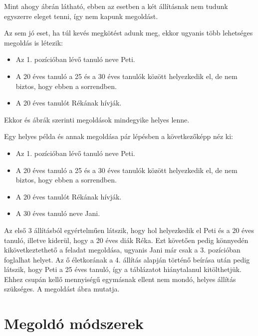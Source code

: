 \documentclass[12pt,a4paper,oneside]{report}
\begin{document}
Mint ahogy  ábrán látható, ebben az esetben a két állításnak nem tudunk egyszerre eleget tenni, így nem kapunk megoldást.


Az sem jó eset, ha túl kevés megkötést adunk meg, ekkor ugyanis több lehetséges megoldás is létezik:
\begin{itemize}
\item Az 1. pozícióban lévő tanuló neve Peti.
\item A 20 éves tanuló a 25 és a 30 éves tanulók között helyezkedik el, de nem biztos, hogy ebben a sorrendben.
\item A 20 éves tanulót Rékának hívják.
\end{itemize}

Ekkor   és  ábrák szerinti megoldások mindegyike helyes lenne.




Egy helyes példa és annak megoldása pár lépésben a következőképp néz ki:
\begin{itemize}
\item Az 1. pozícióban lévő tanuló neve Peti.
\item A 20 éves tanuló a 25 és a 30 éves tanulók között helyezkedik el, de nem biztos, hogy ebben a sorrendben.
\item A 20 éves tanulót Rékának hívják.
\item A 30 éves tanuló neve Jani.
\end{itemize}

Az első 3 állításból egyértelműen látszik, hogy hol helyezkedik el Peti és a 20 éves tanuló, illetve kiderül, hogy a 20 éves diák Réka. 
Ezt követően pedig könnyedén kikövetkeztethető a feladat megoldása, ugyanis Jani már csak a 3. pozícióban foglalhat helyet. 
Az ő életkorának a 4. állítás alapján történő beírása után pedig látszik, hogy Peti a 25 éves tanuló, így a táblázatot hiánytalanul kitölthetjük.
Ehhez csupán kellő mennyiségű egymásnak ellent nem mondó, helyes állítás szükséges. 
A megoldást  ábra mutatja.

    \section{Megoldó módszerek} %
\end{document}

